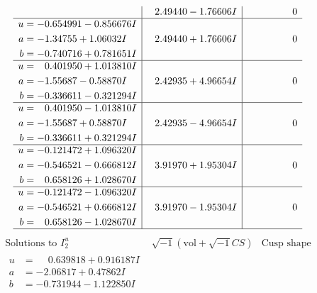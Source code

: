 \documentclass[1p]{elsarticle_modified}
\theoremstyle{definition}
\newcommand{\I}{\sqrt{-1}}
\begin{document}
$$\begin{array}{c|c|c}
 & \phantom{-}2.49440 - 1.76606 I & \phantom{-0.000000 } 0 \\ \hline\begin{aligned}
u &= -0.654991 - 0.856676 I \\
a &= -1.34755 + 1.06032 I \\
b &= -0.740716 + 0.781651 I\end{aligned}
 & \phantom{-}2.49440 + 1.76606 I & \phantom{-0.000000 } 0 \\ \hline\begin{aligned}
u &= \phantom{-}0.401950 + 1.013810 I \\
a &= -1.55687 - 0.58870 I \\
b &= -0.336611 - 0.321294 I\end{aligned}
 & \phantom{-}2.42935 + 4.96654 I & \phantom{-0.000000 } 0 \\ \hline\begin{aligned}
u &= \phantom{-}0.401950 - 1.013810 I \\
a &= -1.55687 + 0.58870 I \\
b &= -0.336611 + 0.321294 I\end{aligned}
 & \phantom{-}2.42935 - 4.96654 I & \phantom{-0.000000 } 0 \\ \hline\begin{aligned}
u &= -0.121472 + 1.096320 I \\
a &= -0.546521 - 0.666812 I \\
b &= \phantom{-}0.658126 + 1.028670 I\end{aligned}
 & \phantom{-}3.91970 + 1.95304 I & \phantom{-0.000000 } 0 \\ \hline\begin{aligned}
u &= -0.121472 - 1.096320 I \\
a &= -0.546521 + 0.666812 I \\
b &= \phantom{-}0.658126 - 1.028670 I\end{aligned}
 & \phantom{-}3.91970 - 1.95304 I & \phantom{-0.000000 } 0\\
 \hline 
 \end{array}$$\newpage$$\begin{array}{c|c|c}  
\text{Solutions to }I^u_{2}& \I (\text{vol} + \sqrt{-1}CS) & \text{Cusp shape}\\
 \hline 
\begin{aligned}
u &= \phantom{-}0.639818 + 0.916187 I \\
a &= -2.06817 + 0.47862 I \\
b &= -0.731944 - 1.122850 I\end{aligned}

\end{array}$$
\end{document}
